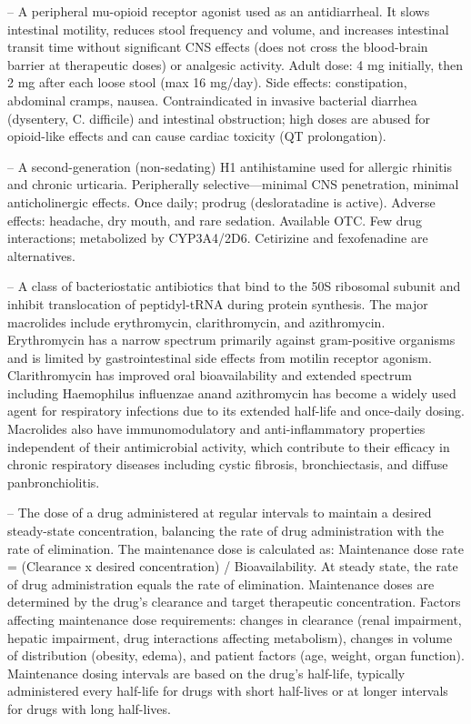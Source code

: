 -- A peripheral mu-opioid receptor agonist used as an antidiarrheal. It slows intestinal motility, reduces stool frequency and volume, and increases intestinal transit time without significant CNS effects (does not cross the blood-brain barrier at therapeutic doses) or analgesic activity. Adult dose: 4 mg initially, then 2 mg after each loose stool (max 16 mg/day). Side effects: constipation, abdominal cramps, nausea. Contraindicated in invasive bacterial diarrhea (dysentery, C. difficile) and intestinal obstruction; high doses are abused for opioid-like effects and can cause cardiac toxicity (QT prolongation).

-- A second-generation (non-sedating) H1 antihistamine used for allergic rhinitis and chronic urticaria. Peripherally selective—minimal CNS penetration, minimal anticholinergic effects. Once daily; prodrug (desloratadine is active). Adverse effects: headache, dry mouth, and rare sedation. Available OTC. Few drug interactions; metabolized by CYP3A4/2D6. Cetirizine and fexofenadine are alternatives.

-- A class of bacteriostatic antibiotics that bind to the 50S ribosomal subunit and inhibit translocation of peptidyl-tRNA during protein synthesis. The major macrolides include erythromycin, clarithromycin, and azithromycin. Erythromycin has a narrow spectrum primarily against gram-positive organisms and is limited by gastrointestinal side effects from motilin receptor agonism. Clarithromycin has improved oral bioavailability and extended spectrum including Haemophilus influenzae anand azithromycin has become a widely used agent for respiratory infections due to its extended half-life and once-daily dosing. Macrolides also have immunomodulatory and anti-inflammatory properties independent of their antimicrobial activity, which contribute to their efficacy in chronic respiratory diseases including cystic fibrosis, bronchiectasis, and diffuse panbronchiolitis.

-- The dose of a drug administered at regular intervals to maintain a desired steady-state concentration, balancing the rate of drug administration with the rate of elimination. The maintenance dose is calculated as: Maintenance dose rate = (Clearance x desired concentration) / Bioavailability. At steady state, the rate of drug administration equals the rate of elimination. Maintenance doses are determined by the drug's clearance and target therapeutic concentration. Factors affecting maintenance dose requirements: changes in clearance (renal impairment, hepatic impairment, drug interactions affecting metabolism), changes in volume of distribution (obesity, edema), and patient factors (age, weight, organ function). Maintenance dosing intervals are based on the drug's half-life, typically administered every half-life for drugs with short half-lives or at longer intervals for drugs with long half-lives.

